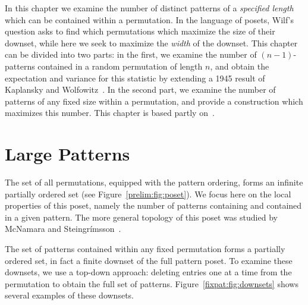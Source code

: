 \documentclass[12pt,twoside]{memoir}
\begin{document}
    In this chapter we examine the number of distinct patterns of a
    \emph{specified length} which can be contained within a permutation. 
    In the language of posets, Wilf's question asks to find which permutations
    which maximize the size of their downset, while here we seek to maximize the
    \emph{width} of the downset. This chapter can be divided into two parts: in
    the first, we examine the number of $(n-1)$-patterns contained in a random
    permutation of length $n$, and obtain the expectation and variance for this statistic
    by extending a 1945 result of Kaplansky and Wolfowitz~\cite{Kaplansky,
    Wolfowitz}. In the second part, we examine the number of patterns of any
    fixed size within a permutation, and provide a construction which maximizes
    this number. This chapter is based partly on~\cite{me-fixpat}.


  \section{Large Patterns}


    The set of all permutations, equipped with the pattern ordering, forms an
    infinite partially ordered set (see Figure~\ref{prelim:fig:poset}). We focus
    here on the local properties of this poset, namely the number of patterns
    containing and contained in a given pattern. The more general topology of
    this poset was studied by McNamara and
    Steingr\'imsson~\cite{Steingrimsson2013}.

    The set of patterns contained within any fixed permutation forms a partially
    ordered set, in fact a finite downset of the full pattern poset.  To examine
    these downsets, we use a top-down approach: deleting entries one at a time
    from the permutation to obtain the full set of patterns.
    Figure~\ref{fixpat:fig:downsets} shows several examples of these
    downsets. 
\end{document}
